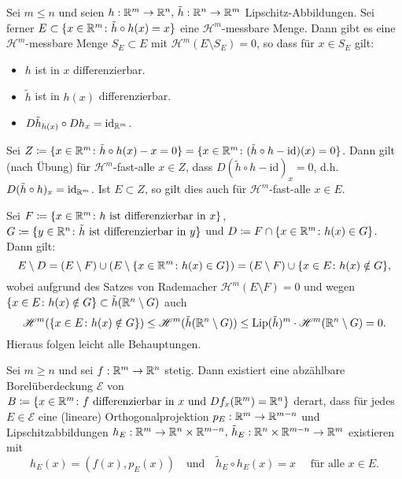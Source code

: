 \documentclass[a4paper,twoside,DIV15,BCOR12mm]{scrbook}
\newcommand{\HM}{\mathscr H}
\newcommand{\id}{\mathrm{id}}
\DeclareMathOperator{\Lip}{Lip}
\begin{document}
\begin{lemma}\label{lem:3.13}
Sei \(m\leq n\) und seien \(h: \mathbb{R}^m\to\mathbb{R}^n,\, \tilde h: \mathbb{R}^n\to\mathbb{R}^m\) Lipschitz-Abbildungen. Sei ferner \(E \subset \{x\in\mathbb{R}^m\colon \tilde h \circ h (x) = x \}\) eine \(\HM^m\)-messbare Menge. Dann gibt es eine \(\HM^m\)-messbare Menge \(S_E \subset E\) mit \(\HM^m(E\setminus S_E) = 0\), so dass für \(x \in S_E\) gilt:
\begin{itemize}
\item \(h\) ist in \(x\) differenzierbar.
\item \(\tilde h\) ist in \(h(x)\) differenzierbar.
\item \(D\tilde h_{h(x)} \circ D  h_x = \id_{\MdR^m}\).
\end{itemize}
\end{lemma}
\begin{beweis}
Sei \(Z \da \{ x\in \MdR^m \colon \tilde h\circ h (x) - x = 0 \} = \{ x\in\MdR^m \colon (\tilde h\circ h-\id)(x) = 0 \}\). Dann gilt (nach Übung) für \(\HM^m\)-fast-alle \(x \in Z\), dass \(D(\tilde h \circ h - \id)_x = 0\), d.h. \(D(\tilde h \circ h)_x = \id_{\MdR^m}\). Ist \(E \subset Z\), so gilt dies auch für \(\HM^m\)-fast-alle \(x\in E\). 

Sei \(F \da \{x\in\MdR^m \colon h \text{ ist differenzierbar in } x\}\), \(G \da \{y\in\MdR^n \colon \tilde h \text{ ist differenzierbar in } y\}\) und \(D \da F \cap \{x\in\MdR^m \colon h(x)\in G\}\). Dann gilt:
\[
E\setminus D = (E\setminus F) \cup (E \setminus \{x\in\mathbb{R}^m \colon h(x) \in G\}) = (E\setminus F) \cup \{x\in E \colon h(x) \notin G\},
\]
wobei aufgrund des Satzes von Rademacher \(\HM^m(E\setminus F) = 0\) und wegen \(\{x\in E \colon h(x) \notin G\} \subset \tilde h(\mathbb{R}^n\setminus G)\) auch 
$$
\HM^m(\{x\in E \colon h(x) \notin G\}) \leq \HM^m(\tilde h(\MdR^n\setminus G)) \leq \Lip(\tilde h)^m \cdot \HM^m(\MdR^n\setminus G) = 0.
$$
Hieraus folgen leicht alle Behauptungen.
\end{beweis}

\begin{lemma}\label{lem:3.14}
Sei \(m\geq n\) und sei \(f: \mathbb{R}^m\to\mathbb{R}^n\) stetig. Dann existiert eine abzählbare Borelüberdeckung \(\mathcal E\) von \(B \da \{x\in\MdR^m \colon f\text{ differenzierbar in } x \text{ und } Df_x(\MdR^m)=\MdR^n\}\) derart, dass für jedes \(E \in \mathcal E\) eine (lineare) Orthogonalprojektion \(p_E: \mathbb{R}^m \to \mathbb{R}^{m-n}\) und Lipschitzabbildungen \(h_E: \mathbb{R}^m \to \mathbb{R}^n \times \mathbb{R}^{m-n},\, \tilde h_E:\mathbb{R}^n\times \mathbb{R}^{m-n} \to \mathbb{R}^m\) existieren mit
\[
h_E(x) = (f(x),p_E(x)) \quad \text{und} \quad \tilde h_E \circ h_E(x) = x \quad \text{ für alle } x\in E.
\]
\end{lemma}
\end{document}
